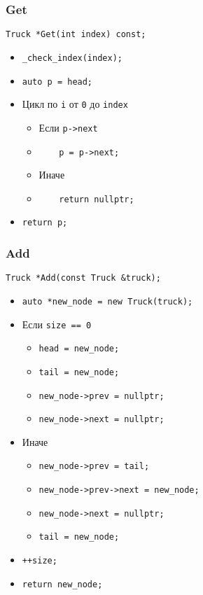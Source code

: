 \subsubsection*{Get}

\begin{lstlisting}
Truck *Get(int index) const;
\end{lstlisting}

\begin{itemize}
	\item \verb|_check_index(index);|
	\item \verb|auto p = head;|
	\item Цикл по \verb|i| от \verb|0| до \verb|index|
	\begin{itemize}
		\item Если \verb|p->next|
		\item \verb|    p = p->next;|
		\item Иначе
		\item \verb|    return nullptr;|
	\end{itemize}
	\item \verb|return p;|
\end{itemize}


\subsubsection*{Add}

\begin{lstlisting}
Truck *Add(const Truck &truck);
\end{lstlisting}

\begin{itemize}
	\item \verb|auto *new_node = new Truck(truck);|
	\item Если \verb|size == 0|
	\begin{itemize}
		\item \verb|head = new_node;|
		\item \verb|tail = new_node;|
		\item \verb|new_node->prev = nullptr;|
		\item \verb|new_node->next = nullptr;|
	\end{itemize}
	\item Иначе
	\begin{itemize}
		\item \verb|new_node->prev = tail;|
		\item \verb|new_node->prev->next = new_node;|
		\item \verb|new_node->next = nullptr;|
		\item \verb|tail = new_node;|
	\end{itemize}
	\item \verb|++size;|
	\item \verb|return new_node;|
\end{itemize}


